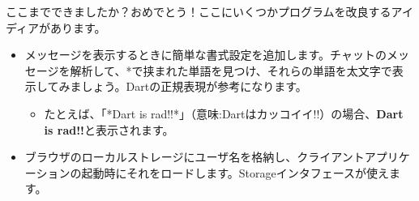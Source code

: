 
ここまでできましたか？おめでとう！ここにいくつかプログラムを改良するアイディアがあります。

\begin{itemize}
\item メッセージを表示するときに簡単な書式設定を追加します。チャットのメッセージを解析して、*で挟まれた単語を見つけ、それらの単語を太文字で表示してみましょう。Dartの正規表現が参考になります。
\begin{itemize}
\item たとえば、「*Dart is rad!!*」（意味:Dartはカッコイイ!!）の場合、{\bf Dart is rad!!}と表示されます。
\end{itemize}
\item ブラウザのローカルストレージにユーザ名を格納し、クライアントアプリケーションの起動時にそれをロードします。Storageインタフェースが使えます。
\end{itemize}

\clearpage
